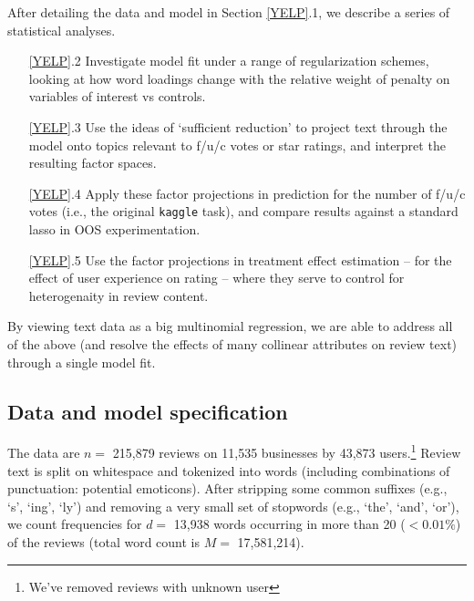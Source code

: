 \documentclass[12pt]{article}
\newcommand{\sgl}{\setstretch{1.1}}
\newcommand{\cd}[1]{{\tt#1}}
\begin{document}
After detailing the  data and model in Section
\ref{YELP}.1, we describe a series of statistical analyses.
\begin{itemize}\sgl
\item[\ref{YELP}.2] Investigate model fit under a range of regularization
schemes, looking at how word loadings change with the relative  weight of
penalty on variables of interest vs controls.
\item[\ref{YELP}.3] Use the ideas of `sufficient reduction' to project text
through the model onto topics relevant to f/u/c votes or star ratings, and
interpret the resulting factor spaces.
\item[\ref{YELP}.4] Apply these factor projections in prediction for the
number of f/u/c votes (i.e., the original \cd{kaggle} task), and compare
results against a standard lasso in OOS experimentation.
\item[\ref{YELP}.5] Use the factor projections in treatment effect
estimation -- for the effect of user experience on rating -- where they serve
to control for heterogenaity in review content.
\end{itemize}
By viewing text data as a big multinomial regression, we are able to address
all of the above (and resolve the effects of many collinear attributes on
review text) through a single model fit.

\subsection{Data and model specification}

The data are $n=$ 215,879 reviews on 11,535 businesses by 43,873
users.\footnote{We've removed reviews with unknown user} Review text is split
on whitespace and tokenized into words (including combinations of punctuation:
potential emoticons). After stripping some common suffixes (e.g., `s', `ing',
`ly') and removing a very small set of stopwords (e.g., `the', `and', `or'),
we count frequencies for $d=$ 13,938 words occurring in more than 20 ($<
0.01\%$) of the reviews (total word count is $M=$ 17,581,214).  
\end{document}

